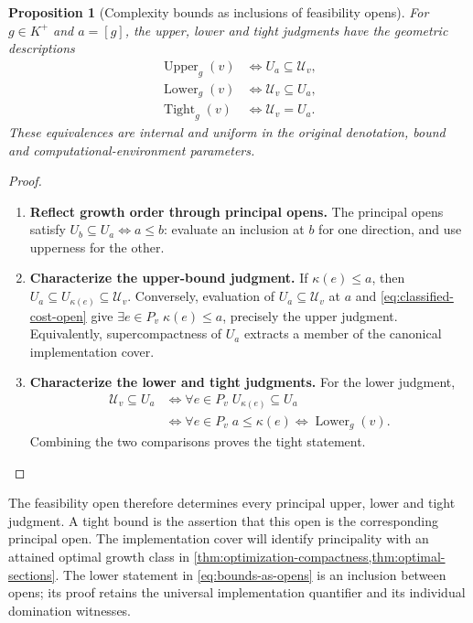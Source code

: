 \documentclass[11pt,a4paper]{article}
\numberwithin{algorithm}{section}
\numberwithin{equation}{section}
\newtheorem{proposition}[proposition]{Proposition}
\theoremstyle{definition}
\theoremstyle{remark}
\theoremstyle{plain}
\theoremstyle{definition}
\theoremstyle{plain}
\begin{document}
\begin{proposition}[Complexity bounds as inclusions of feasibility opens]
\label{prop:bounds-as-opens}
For $g\in K^+$ and $a=[g]$, the upper, lower and tight judgments
have the geometric descriptions
\begin{equation}\label{eq:bounds-as-opens}
 \begin{aligned}
 \operatorname{Upper}_g(v)&\iff U_a\subseteq\mathcal U_v,\\
 \operatorname{Lower}_g(v)&\iff\mathcal U_v\subseteq U_a,\\
 \operatorname{Tight}_g(v)&\iff\mathcal U_v=U_a.
 \end{aligned}
\end{equation}
These equivalences are internal and uniform in the original
denotation, bound and computational-environment parameters.
\end{proposition}
\begin{proof}\leavevmode
\begin{enumerate}[leftmargin=*,align=left]
\item \textbf{Reflect growth order through principal opens.}
The principal opens satisfy
$U_b\subseteq U_a\iff a\le b$: evaluate an inclusion at $b$
for one direction, and use upperness for the other.

\item \textbf{Characterize the upper-bound judgment.}
If $\kappa(e)\le a$, then
$U_a\subseteq U_{\kappa(e)}\subseteq\mathcal U_v$.
Conversely, evaluation of $U_a\subseteq\mathcal U_v$ at $a$
and \eqref{eq:classified-cost-open} give
$\exists e\in P_v\;\kappa(e)\le a$, precisely the upper judgment.
Equivalently, supercompactness of $U_a$ extracts a member of the
canonical implementation cover.

\item \textbf{Characterize the lower and tight judgments.}
For the lower judgment,
\[
 \begin{aligned}
 \mathcal U_v\subseteq U_a
 &\iff\forall e\in P_v\;U_{\kappa(e)}\subseteq U_a\\
 &\iff\forall e\in P_v\;a\le\kappa(e)
 \iff\operatorname{Lower}_g(v).
 \end{aligned}
\]
Combining the two comparisons proves the tight statement.
\end{enumerate}
\end{proof}

The feasibility open therefore determines every principal upper,
lower and tight judgment.  A tight bound is the assertion that this
open is the corresponding principal open.  The implementation cover
will identify principality with an attained optimal growth class in
\cref{thm:optimization-compactness,thm:optimal-sections}.
The lower statement in \eqref{eq:bounds-as-opens} is an inclusion
between opens; its proof retains the universal
implementation quantifier and its individual domination witnesses.
\end{document}
